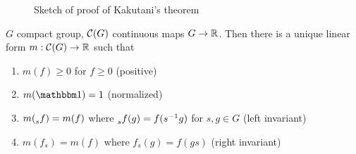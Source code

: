\begin{figure}[ht]
  \centering
  \caption{Sketch of proof of Kakutani's theorem}
\end{figure}

\begin{theorem}
  \label{thm:haar-measure}
  $G$ compact group, $\mathcal{C}(G)$ continuous maps $G \to \mathbb{R}$.
  Then there is a unique linear form $m : \mathcal{C}(G) \to \mathbb{R}$ such that
  \begin{enumerate}
    \item $m(f) \geq 0$ for $f \geq 0$ (positive)
    \item $m(\ind) = 1$ (normalized)
    \item $m(\prescript{}{s}{f}) = m(f)$ where
      $\prescript{}{s}{f}(g) = f(s^{-1} g)$
      for $s,g \in G$ (left invariant)
    \item $m(f_s) = m(f)$ where $f_s(g) = f(gs)$ (right invariant)
  \end{enumerate}
\end{theorem}


